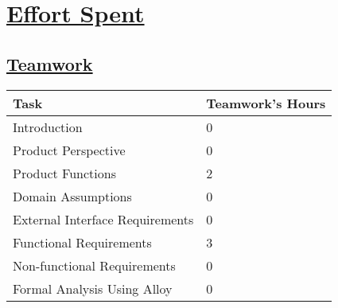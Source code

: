 \section[Effort Spent]{\hyperlink{toc}{Effort Spent}}
\label{sec:effortSpent}

\subsection[Teamwork]{\hyperlink{toc}{Teamwork}}
\vspace{2mm}
\begin{center}
	\begin{tabular}{| l | p{} |}
		\hline
		\textbf{Task} & \textbf{Teamwork's Hours} \\ \hline
		Introduction & 0 \\ \hline
		Product Perspective & 0 \\ \hline
		Product Functions & 2 \\ \hline
		Domain Assumptions & 0 \\ \hline
		External Interface Requirements & 0 \\ \hline
		Functional Requirements & 3 \\ \hline
		Non-functional Requirements & 0 \\ \hline
		Formal Analysis Using Alloy & 0 \\
		\hline	
	\end{tabular}
\end{center}

